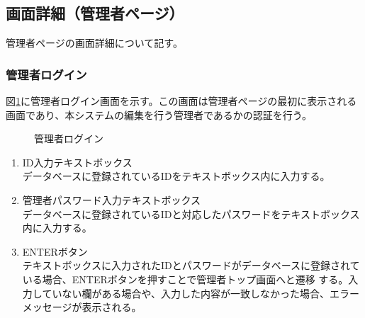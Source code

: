 \documentclass[a4j]{jarticle}
\begin{document}
\subsection{画面詳細（管理者ページ）}
管理者ページの画面詳細について記す。

\subsubsection{管理者ログイン}
図\ref{fig:login_admin}に管理者ログイン画面を示す。この画面は管理者ページの最初に表示される画面であり、本システムの編集を行う管理者であるかの認証を行う。
\begin{figure}[H]
\centering
{}
\caption{管理者ログイン}
\label{fig:login_admin}
\end{figure}
\begin{enumerate}
  \renewcommand{\labelenumi}{\textcircled{\scriptsize \theenumi}}

\item ID入力テキストボックス\\
データベースに登録されているIDをテキストボックス内に入力する。
\item 管理者パスワード入力テキストボックス\\
データベースに登録されているIDと対応したパスワードをテキストボックス内に入力する。
\item ENTERボタン\\
テキストボックスに入力されたIDとパスワードがデータベースに登録されている場合、ENTERボタンを押すことで管理者トップ画面へと遷移
する。入力していない欄がある場合や、入力した内容が一致しなかった場合、エラーメッセージが表示される。

\end{enumerate}
  \renewcommand{\labelenumi}{\textcircled{\scriptsize \theenumi}}
\end{document}
